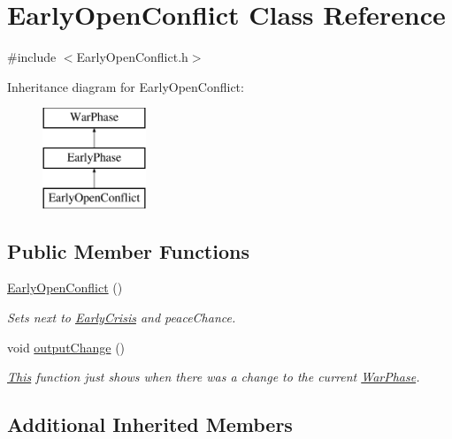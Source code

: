 \hypertarget{class_early_open_conflict}{}\section{Early\+Open\+Conflict Class Reference}
\label{class_early_open_conflict}


{\ttfamily \#include $<$Early\+Open\+Conflict.\+h$>$}

Inheritance diagram for Early\+Open\+Conflict\+:\begin{figure}[H]
\begin{center}
\leavevmode
\includegraphics[height=3.000000cm]{class_early_open_conflict}
\end{center}
\end{figure}
\subsection*{Public Member Functions}
\begin{DoxyCompactItemize}
\item 
\mbox{\hyperlink{class_early_open_conflict_a40fea65b091222fde271c9161b200c0a}{Early\+Open\+Conflict}} ()
\begin{DoxyCompactList}\small\item\em Sets next to \mbox{\hyperlink{class_early_crisis}{Early\+Crisis}} and peace\+Chance. \end{DoxyCompactList}\item 
void \mbox{\hyperlink{class_early_open_conflict_a5326352607a97d660280fc97da533cf6}{output\+Change}} ()
\begin{DoxyCompactList}\small\item\em \mbox{\hyperlink{class_this}{This}} function just shows when there was a change to the current \mbox{\hyperlink{class_war_phase}{War\+Phase}}. \end{DoxyCompactList}\end{DoxyCompactItemize}
\subsection*{Additional Inherited Members}


